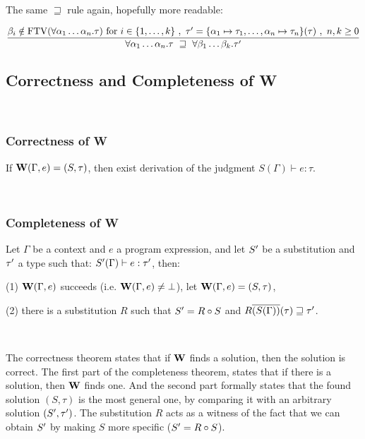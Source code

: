 \documentclass[a4paper,oneside]{memoir}
\begin{document}
The same $\sqsupseteq$ rule again, hopefully more readable:

$$\dfrac{\beta_i \notin \operatorname{FTV}(\forall \alpha_1\dots\alpha_n.\tau) \text{ for } i \in \{1,\dots,k\}\ ,\ \tau^\prime = \{ \alpha_1 \mapsto \tau_1,  \dots, \alpha_n \mapsto \tau_n \}(\tau)\ , \ n,k \geq 0}{\forall \alpha_1\dots\alpha_n.\tau  ~ \sqsupseteq ~   \forall \beta_1\dots\beta_k.\tau^\prime}$$



\subsection{Correctness and Completeness of W}

~

\subsubsection{Correctness of W}

If $\operatorname{\textbf{W}}(\Gamma, e) = (S, \tau)$, then exist derivation of the judgment $S(\Gamma) \vdash e : \tau$.

~

\subsubsection{Completeness of W}

Let $\Gamma$ be a context and $e$ a program expression,
and let $S^\prime$ be a substitution and $\tau^\prime$ a type such that:
$ S^\prime(\Gamma) \vdash e : \tau^\prime $, 
then:

(1) $\operatorname{\textbf{W}}(\Gamma,e)$ succeeds (i.e. $\operatorname{\textbf{W}}(\Gamma,e) \neq \bot$), 
let $\operatorname{\textbf{W}}(\Gamma,e) = (S, \tau)$,

(2) there is a substitution $R$ such that $S^\prime = R \circ S$ 
and $R\overline{(S(\Gamma))}(\tau) \sqsupseteq \tau^\prime$. 

~ 

The correctness theorem states that if $\operatorname{\textbf{W}}$ finds a solution, then the solution is correct.
The first part of the completeness theorem, states that if there is a solution, then $\operatorname{\textbf{W}}$ finds one. And the second part formally states that the found solution $(S,\tau)$ is the most general one, by comparing it with an arbitrary solution $(S^\prime,\tau^\prime)$. The substitution $R$ acts as a witness of the fact that we can obtain $S^\prime$ by making $S$ more specific ($S^\prime = R \circ S$).  

\end{document}
